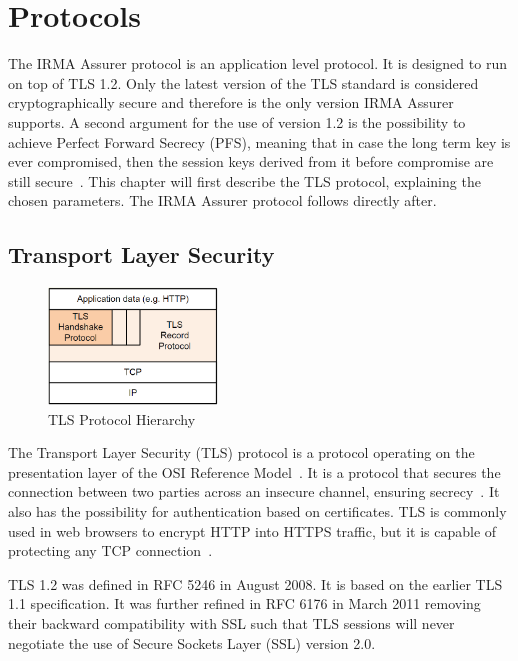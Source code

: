 \section{Protocols}
\label{sec:protocols}
The IRMA Assurer protocol is an application level protocol. It is designed to run on top of TLS 1.2. Only the latest version of the TLS standard is considered cryptographically secure and therefore is the only version IRMA Assurer supports. A second argument for the use of version 1.2 is the possibility to achieve Perfect Forward Secrecy (PFS), meaning that in case the long term key is ever compromised, then the session keys derived from it before compromise are still secure~\cite{PFS}. This chapter will first describe the TLS protocol, explaining the chosen parameters. The IRMA Assurer protocol follows directly after.

\subsection{Transport Layer Security}
\begin{figure}
  \centering
	\includegraphics[width=0.4\textwidth]{images/tlsstack.png}
	\caption{TLS Protocol Hierarchy}
	\label{fig:tlsstack}
\end{figure}

The Transport Layer Security (TLS) protocol is a protocol operating on the presentation layer of the OSI Reference Model~\cite{osi}. It is a protocol that secures the connection between two parties across an insecure channel, ensuring secrecy~\cite{tls1.2}. It also has the possibility for authentication based on certificates. TLS is commonly used in web browsers to encrypt HTTP into HTTPS traffic, but it is capable of protecting any TCP connection~\cite{lecture}.

TLS 1.2 was defined in RFC 5246 in August 2008. It is based on the earlier TLS 1.1 specification. It was further refined in RFC 6176 in March 2011 removing their backward compatibility with SSL such that TLS sessions will never negotiate the use of Secure Sockets Layer (SSL) version 2.0.

